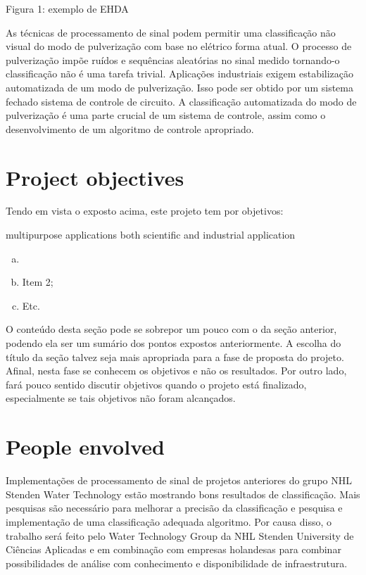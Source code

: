 Figura 1: exemplo de EHDA

As técnicas de processamento de sinal podem permitir uma classificação não visual do modo de pulverização com base no elétrico
forma atual. O processo de pulverização impõe ruídos e sequências aleatórias no sinal medido tornando-o
classificação não é uma tarefa trivial.
Aplicações industriais exigem estabilização automatizada de um modo de pulverização. Isso pode ser obtido por um sistema fechado
sistema de controle de circuito. A classificação automatizada do modo de pulverização é uma parte crucial de um sistema de controle, assim como
o desenvolvimento de um algoritmo de controle apropriado.

\section{Project objectives}
\label{sec:objetivos}

Tendo em vista o exposto acima, este projeto tem por objetivos:

multipurpose applications
both scientific and industrial application

\begin{enumerate}[a)]
\item 
\item Item 2; 
\item Etc.     
\end{enumerate}

O conteúdo desta seção pode se sobrepor um pouco com o da seção anterior, podendo ela ser um sumário dos pontos expostos anteriormente. A escolha do título da seção talvez seja mais apropriada para a fase de proposta do projeto. Afinal, nesta fase se conhecem os objetivos e não os resultados. Por outro lado, fará pouco sentido discutir objetivos quando o projeto está finalizado, especialmente se tais objetivos não foram alcançados. 


\section{People envolved}
\label{sec:empresa}

Implementações de processamento de sinal de projetos anteriores
do grupo NHL Stenden Water Technology estão mostrando bons resultados de classificação. Mais pesquisas são
necessário para melhorar a precisão da classificação e pesquisa e implementação de uma classificação adequada
algoritmo. Por causa disso, o trabalho será feito pelo Water Technology Group da NHL Stenden University
de Ciências Aplicadas e em combinação com empresas holandesas para combinar possibilidades de análise com conhecimento
e disponibilidade de infraestrutura.
